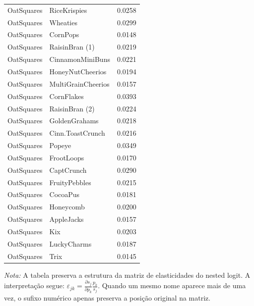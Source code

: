 \begin{table}[H]
\begin{tabular}{llr}
OatSquares & RiceKrispies & 0.0258 \\
OatSquares & Wheaties & 0.0299 \\
OatSquares & CornPops & 0.0148 \\
OatSquares & RaisinBran (1) & 0.0219 \\
OatSquares & CinnamonMiniBuns & 0.0221 \\
OatSquares & HoneyNutCheerios & 0.0194 \\
OatSquares & MultiGrainCheerios & 0.0157 \\
OatSquares & CornFlakes & 0.0393 \\
OatSquares & RaisinBran (2) & 0.0224 \\
OatSquares & GoldenGrahams & 0.0218 \\
OatSquares & Cinn.ToastCrunch & 0.0216 \\
OatSquares & Popeye & 0.0349 \\
OatSquares & FrootLoops & 0.0170 \\
OatSquares & CaptCrunch & 0.0290 \\
OatSquares & FruityPebbles & 0.0215 \\
OatSquares & CocoaPus & 0.0181 \\
OatSquares & Honeycomb & 0.0200 \\
OatSquares & AppleJacks & 0.0157 \\
OatSquares & Kix & 0.0203 \\
OatSquares & LuckyCharms & 0.0187 \\
OatSquares & Trix & 0.0145 \\
\bottomrule
\end{tabular}

\vspace{0.3em}
\footnotesize
\textit{Nota:} A tabela preserva a estrutura da matriz de elasticidades do nested logit. A interpretação segue: $\varepsilon_{jk}=\frac{\partial s_j}{\partial p_k}\frac{p_k}{s_j}$. Quando um mesmo nome aparece mais de uma vez, o sufixo numérico apenas preserva a posição original na matriz.
\end{table}
\endgroup


